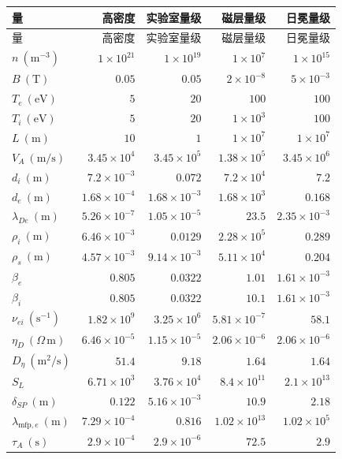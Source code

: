 \begin{longtable}{P{38mm}rrrr}
\toprule 量 & 高密度 & 实验室量级 & 磁层量级 & 日冕量级\\\midrule\endfirsthead
\toprule 量 & 高密度 & 实验室量级 & 磁层量级 & 日冕量级\\\midrule\endhead
$n\ (\mathrm{m^{-3}})$ & $1\times10^{21}$ & $1\times10^{19}$ & $1\times10^{7}$ & $1\times10^{15}$\\
$B\ (\mathrm T)$ & $0.05$ & $0.05$ & $2\times10^{-8}$ & $5\times10^{-3}$\\
$T_e\ (\mathrm{eV})$ & $5$ & $20$ & $100$ & $100$\\
$T_i\ (\mathrm{eV})$ & $5$ & $20$ & $1\times10^{3}$ & $100$\\
$L\ (\mathrm m)$ & $10$ & $1$ & $1\times10^{7}$ & $1\times10^{7}$\\
$V_A\ (\mathrm{m/s})$ & $3.45\times10^{4}$ & $3.45\times10^{5}$ & $1.38\times10^{5}$ & $3.45\times10^{6}$\\
$d_i\ (\mathrm m)$ & $7.2\times10^{-3}$ & $0.072$ & $7.2\times10^{4}$ & $7.2$\\
$d_e\ (\mathrm m)$ & $1.68\times10^{-4}$ & $1.68\times10^{-3}$ & $1.68\times10^{3}$ & $0.168$\\
$\lambda_{De}\ (\mathrm m)$ & $5.26\times10^{-7}$ & $1.05\times10^{-5}$ & $23.5$ & $2.35\times10^{-3}$\\
$\rho_i\ (\mathrm m)$ & $6.46\times10^{-3}$ & $0.0129$ & $2.28\times10^{5}$ & $0.289$\\
$\rho_s\ (\mathrm m)$ & $4.57\times10^{-3}$ & $9.14\times10^{-3}$ & $5.11\times10^{4}$ & $0.204$\\
$\beta_e$ & $0.805$ & $0.0322$ & $1.01$ & $1.61\times10^{-3}$\\
$\beta_i$ & $0.805$ & $0.0322$ & $10.1$ & $1.61\times10^{-3}$\\
$\nu_{ei}\ (\mathrm{s^{-1}})$ & $1.82\times10^{9}$ & $3.25\times10^{6}$ & $5.81\times10^{-7}$ & $58.1$\\
$\eta_D\ (\Omega\,\mathrm m)$ & $6.46\times10^{-5}$ & $1.15\times10^{-5}$ & $2.06\times10^{-6}$ & $2.06\times10^{-6}$\\
$D_\eta\ (\mathrm{m^2/s})$ & $51.4$ & $9.18$ & $1.64$ & $1.64$\\
$S_L$ & $6.71\times10^{3}$ & $3.76\times10^{4}$ & $8.4\times10^{11}$ & $2.1\times10^{13}$\\
$\delta_{SP}\ (\mathrm m)$ & $0.122$ & $5.16\times10^{-3}$ & $10.9$ & $2.18$\\
$\lambda_{\mathrm{mfp},e}\ (\mathrm m)$ & $7.29\times10^{-4}$ & $0.816$ & $1.02\times10^{13}$ & $1.02\times10^{5}$\\
$\tau_A\ (\mathrm s)$ & $2.9\times10^{-4}$ & $2.9\times10^{-6}$ & $72.5$ & $2.9$\\
\bottomrule\end{longtable}
